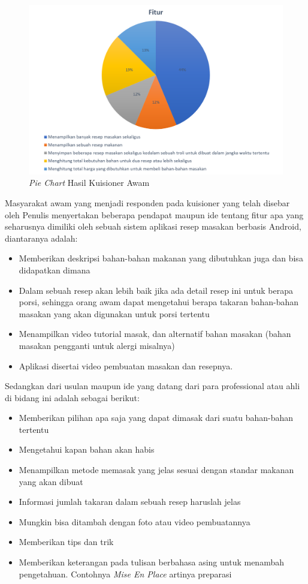 	\begin{figure}[H]
		\centering
		\includegraphics[width=1\textwidth]{gambar/pie/kuisioner_awam}
		\caption{\textit{Pie Chart} Hasil Kuisioner Awam}
	\end{figure}
	
	Masyarakat awam yang menjadi responden pada kuisioner yang telah disebar oleh Penulis menyertakan beberapa pendapat maupun ide tentang fitur apa yang seharusnya dimiliki oleh sebuah sistem aplikasi resep masakan berbasis Android, diantaranya adalah:
	\begin{itemize}
		\item Memberikan deskripsi bahan-bahan makanan yang dibutuhkan juga dan bisa didapatkan dimana
		\item Dalam sebuah resep akan lebih baik jika ada detail resep ini untuk berapa porsi, sehingga orang awam dapat mengetahui berapa takaran bahan-bahan masakan yang akan digunakan untuk porsi tertentu
		\item Menampilkan video tutorial masak, dan alternatif bahan masakan (bahan masakan pengganti untuk alergi misalnya)
		\item Aplikasi disertai video pembuatan masakan dan resepnya.	
	\end{itemize}
	
	Sedangkan dari usulan maupun ide yang datang dari para professional atau ahli di bidang ini adalah sebagai berikut:
	\begin{itemize}		
		\item Memberikan pilihan apa saja yang dapat dimasak dari suatu bahan-bahan tertentu
		\item Mengetahui kapan bahan akan habis
		\item Menampilkan metode memasak yang jelas sesuai dengan standar makanan yang akan dibuat
		\item Informasi jumlah takaran dalam sebuah resep haruslah jelas
		\item Mungkin bisa ditambah dengan foto atau video pembuatannya 
		\item Memberikan tips dan trik 
		\item Memberikan keterangan pada tulisan berbahasa asing untuk menambah pengetahuan. Contohnya \emph{Mise En Place} artinya preparasi
	\end{itemize}

